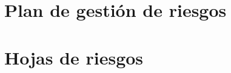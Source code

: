 \appendix
\chapter{Plan de gestión de riesgos}\label{appendix:plan-gestion-riesgos}

\chapter{Hojas de riesgos}\label{appendix:hojas-riesgos}
